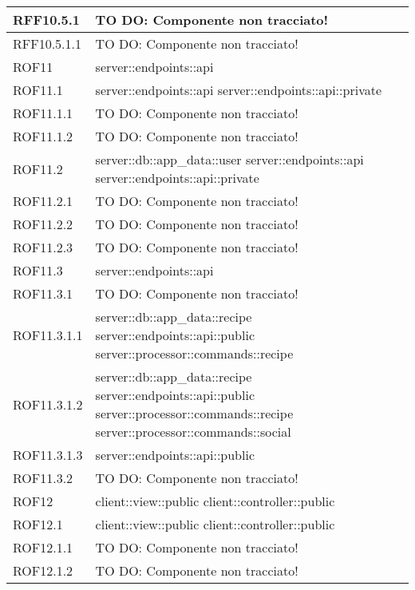 \begin{center}
\begin{longtable}{| p{4cm} | p{8cm} |}
\hline
RFF10.5.1 & TO DO: Componente non tracciato! \\
\hline
RFF10.5.1.1 & TO DO: Componente non tracciato! \\
\hline
ROF11 & server::endpoints::api \\
\hline
ROF11.1 & server::endpoints::api \newline server::endpoints::api::private \\
\hline
ROF11.1.1 & TO DO: Componente non tracciato! \\
\hline
ROF11.1.2 & TO DO: Componente non tracciato! \\
\hline
ROF11.2 & server::db::app\_data::user \newline server::endpoints::api \newline server::endpoints::api::private \\
\hline
ROF11.2.1 & TO DO: Componente non tracciato! \\
\hline
ROF11.2.2 & TO DO: Componente non tracciato! \\
\hline
ROF11.2.3 & TO DO: Componente non tracciato! \\
\hline
ROF11.3 & server::endpoints::api \\
\hline
ROF11.3.1 & TO DO: Componente non tracciato! \\
\hline
ROF11.3.1.1 & server::db::app\_data::recipe \newline server::endpoints::api::public \newline server::processor::commands::recipe \\
\hline
ROF11.3.1.2 & server::db::app\_data::recipe \newline server::endpoints::api::public \newline server::processor::commands::recipe \newline server::processor::commands::social \\
\hline
ROF11.3.1.3 & server::endpoints::api::public \\
\hline
ROF11.3.2 & TO DO: Componente non tracciato! \\
\hline
ROF12 & client::view::public \newline client::controller::public \\
\hline
ROF12.1 & client::view::public \newline client::controller::public \\
\hline
ROF12.1.1 & TO DO: Componente non tracciato! \\
\hline
ROF12.1.2 & TO DO: Componente non tracciato! \\

\end{longtable}
\end{center}
